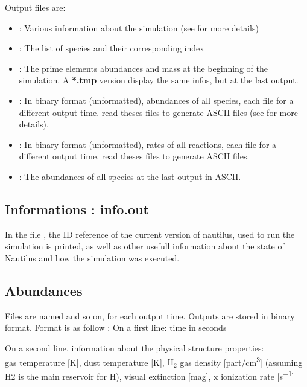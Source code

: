 \documentclass[english,a4paper,twoside]{article}
\newcommand{\molecule}[1]{\ensuremath{\mathrm{#1}}}
\begin{document}
Output files are:
\begin{itemize}
\item {}: Various information about the simulation (see  for more details)
\item {}: The list of species and their corresponding index
\item {}: The prime elements abundances and mass at the beginning of the simulation. A \textbf{*.tmp} version display the same infos, but at the last output.
\item {}: In binary format (unformatted), abundances of all species, each file for a different output time.  read theses files to generate ASCII files (see  for more details).
\item {}: In binary format (unformatted), rates of all reactions, each file for a different output time.  read theses files to generate ASCII files.
\item {}: The abundances of all species at the last output in ASCII.
\end{itemize}

\subsection{Informations : info.out}\label{sec:info-out}
In the file , the ID reference of the current version of nautilus, used to run the simulation is printed, as well as other usefull information about the state of Nautilus and how the simulation was executed.

\subsection{Abundances}\label{sec:abundances}
Files are named  and so on, for each output time. Outputs are stored in binary format. Format is as follow : 
On a first line: time in seconds

On a second line, information about the physical structure properties: \\
gas temperature [\unit{K}], dust temperature [\unit{K}], \molecule{H_2} gas density [\unit{part/cm^3}] (assuming H2 is the main reservoir for H), visual extinction [\unit{mag}], x ionization rate [\unit{s^{-1}}]
\end{document}
